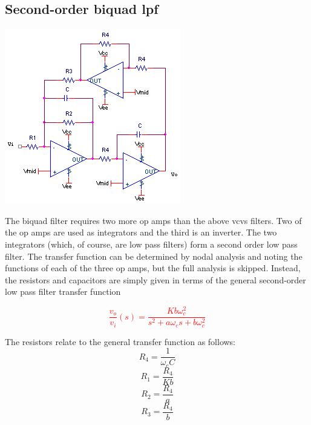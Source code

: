 \subsection{Second-order biquad \acl{lpf}}
\begin{center}
	\includegraphics{schematics/2ndorderbiquadLPfilter.PNG}
\end{center}
The biquad filter requires two more op amps than the above \ac{vcvs} filters.
Two of the op amps are used as integrators and the third is an inverter.
The two integrators (which, of course, are low pass filters) form a second order low pass filter.
The transfer function can be determined by nodal analysis and noting the functions of each of the three op amps, but the full analysis is skipped.
Instead, the resistors and capacitors are simply given in terms of the general second-order low pass filter transfer function

\textcolor{red}{
\begin{equation}
\frac{v_{o}}{v_{i}}(s) = \frac{Kb\omega_{c}^{2}}{s^{2} + a\omega_{c}s + b\omega_{c}^{2}}
\label{eq:2ndorderbiquadLPfilter}
\end{equation}
}

The resistors relate to the general transfer function as follows:
\begin{equation}
R_4 = \frac{1}{\omega_{c}C}
\end{equation}
\begin{equation}
R_1 = \frac{R_4}{Kb}
\end{equation}
\begin{equation}
R_2 = \frac{R_4}{a}
\end{equation}
\begin{equation}
R_3 = \frac{R_4}{b}
\end{equation}

